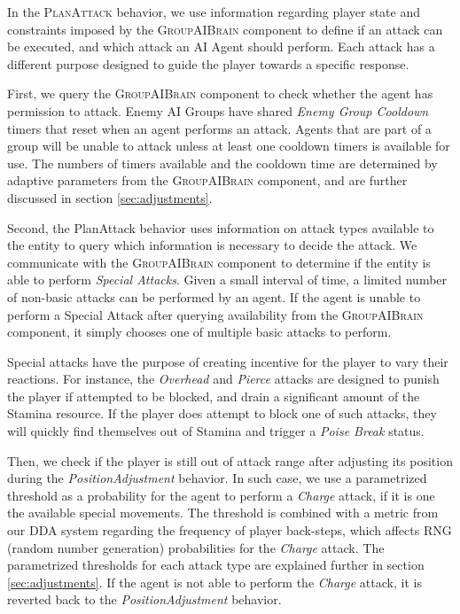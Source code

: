 

In the \textsc{PlanAttack} behavior, we use information regarding player state and constraints imposed by the \textsc{GroupAIBrain} component to define if an attack can be executed, and which attack an AI Agent should perform. Each attack has a different purpose designed to guide the player towards a specific response.

First, we query the \textsc{GroupAIBrain} component to check whether the agent has permission to attack. Enemy AI Groups have shared  \emph{Enemy Group Cooldown} timers that reset when an agent performs an attack. Agents that are part of a group will be unable to attack unless at least one cooldown timers is available for use. The numbers of timers available and the cooldown time are determined by adaptive parameters from the \textsc{GroupAIBrain} component, and are further discussed in section \ref{sec:adjustments}.

Second, the PlanAttack behavior uses information on attack types available to the entity to query which information is necessary to decide the attack. We communicate with the \textsc{GroupAIBrain} component to determine if the entity is able to perform \emph{Special Attacks}. Given a small interval of time, a limited number of non-basic attacks can be performed by an agent. If the agent is unable to perform a Special Attack after querying availability from the \textsc{GroupAIBrain} component, it simply chooses one of multiple basic attacks to perform.

Special attacks have the purpose of creating incentive for the player to vary their reactions. For instance, the \emph{Overhead} and \emph{Pierce} attacks are designed to punish the player if attempted to be blocked, and drain a significant amount of the Stamina resource. If the player does attempt to block one of such attacks, they will quickly find themselves out of Stamina and trigger a \emph{Poise Break} status.

Then, we check if the player is still out of attack range after adjusting its position during the \emph{PositionAdjustment} behavior. In such case, we use a parametrized threshold as a probability for the agent to perform a \emph{Charge} attack, if it is one the available special movements. The threshold is combined with a metric from our DDA system regarding the frequency of player back-steps, which affects RNG (random number generation) probabilities for the \emph{Charge} attack. The parametrized thresholds for each attack type are explained further in section \ref{sec:adjustments}. If the agent is not able to perform the \emph{Charge} attack, it is reverted back to the \emph{PositionAdjustment} behavior.

